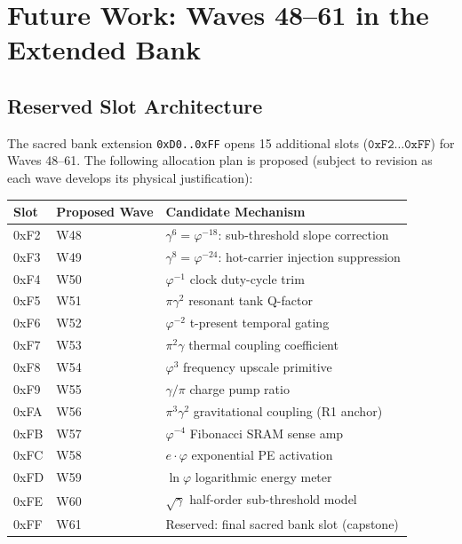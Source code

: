 \section{Future Work: Waves 48--61 in the Extended Bank}
\label{app:future-work}

\subsection{Reserved Slot Architecture}

The sacred bank extension \texttt{0xD0..0xFF} opens 15 additional slots
($\texttt{0xF2}\ldots\texttt{0xFF}$) for Waves 48--61.
The following allocation plan is proposed (subject to revision as each wave
develops its physical justification):

\begin{center}
\begin{tabular}{lll}
\hline
\textbf{Slot} & \textbf{Proposed Wave} & \textbf{Candidate Mechanism} \\
\hline
0xF2 & W48 & $\gamma^{6} = \varphi^{-18}$: sub-threshold slope correction \\
0xF3 & W49 & $\gamma^{8} = \varphi^{-24}$: hot-carrier injection suppression \\
0xF4 & W50 & $\varphi^{-1}$ clock duty-cycle trim \\
0xF5 & W51 & $\pi \gamma^{2}$ resonant tank Q-factor \\
0xF6 & W52 & $\varphi^{-2}$ t-present temporal gating \\
0xF7 & W53 & $\pi^{2} \gamma$ thermal coupling coefficient \\
0xF8 & W54 & $\varphi^{3}$ frequency upscale primitive \\
0xF9 & W55 & $\gamma / \pi$ charge pump ratio \\
0xFA & W56 & $\pi^{3} \gamma^{2}$ gravitational coupling (R1 anchor) \\
0xFB & W57 & $\varphi^{-4}$ Fibonacci SRAM sense amp \\
0xFC & W58 & $e \cdot \varphi$ exponential PE activation \\
0xFD & W59 & $\ln \varphi$ logarithmic energy meter \\
0xFE & W60 & $\sqrt{\gamma}$ half-order sub-threshold model \\
0xFF & W61 & Reserved: final sacred bank slot (capstone) \\
\hline
\end{tabular}
\end{center}

